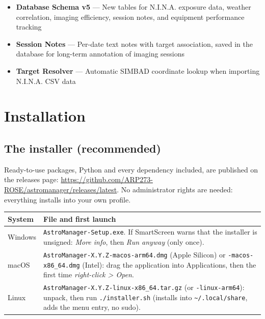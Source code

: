 \documentclass[11pt,a4paper]{article}
\begin{document}
\begin{newfeaturebox}
\begin{itemize}
    \item \textbf{Database Schema v5} --- New tables for N.I.N.A. exposure data, weather correlation, imaging efficiency, session notes, and equipment performance tracking
    \item \textbf{Session Notes} --- Per-date text notes with target association, saved in the database for long-term annotation of imaging sessions
    \item \textbf{Target Resolver} --- Automatic SIMBAD coordinate lookup when importing N.I.N.A. CSV data
\end{itemize}
\end{newfeaturebox}


\section{Installation}
\label{sec:install}

\subsection{The installer (recommended)}

Ready-to-use packages, Python and every dependency included, are published on
the releases page:
\url{https://github.com/ARP273-ROSE/astromanager/releases/latest}. No
administrator rights are needed: everything installs into your own profile.

\begin{center}
\begin{tabularx}{\linewidth}{@{}l>{\raggedright\arraybackslash}X@{}}
\toprule
\textbf{System} & \textbf{File and first launch} \\
\midrule
Windows & \texttt{AstroManager-Setup.exe}. If SmartScreen warns that the
installer is unsigned: \emph{More info}, then \emph{Run anyway} (only once). \\
macOS & \texttt{AstroManager-X.Y.Z-macos-arm64.dmg} (Apple Silicon) or
\texttt{-macos-x86\_64.dmg} (Intel): drag the application into Applications,
then the first time \emph{right-click > Open}. \\
Linux & \texttt{AstroManager-X.Y.Z-linux-x86\_64.tar.gz} (or \texttt{-linux-arm64}):
unpack, then run \texttt{./installer.sh} (installs into
\texttt{\textasciitilde/.local/share}, adds the menu entry, no sudo). \\
\bottomrule
\end{tabularx}
\end{center}
\end{document}
